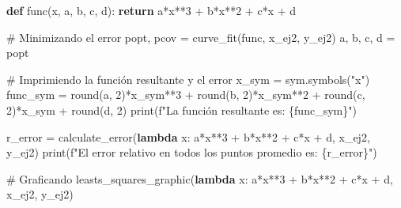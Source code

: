 \documentclass[
  letterpaper,
  DIV=11,
  numbers=noendperiod]{scrartcl}
\newenvironment{Shaded}{\begin{snugshade}}{\end{snugshade}}
\newcommand{\BuiltInTok}[1]{\textcolor[rgb]{0.00,0.23,0.31}{#1}}
\newcommand{\CommentTok}[1]{\textcolor[rgb]{0.37,0.37,0.37}{#1}}
\newcommand{\ControlFlowTok}[1]{\textcolor[rgb]{0.00,0.23,0.31}{\textbf{#1}}}
\newcommand{\DecValTok}[1]{\textcolor[rgb]{0.68,0.00,0.00}{#1}}
\newcommand{\KeywordTok}[1]{\textcolor[rgb]{0.00,0.23,0.31}{\textbf{#1}}}
\newcommand{\NormalTok}[1]{\textcolor[rgb]{0.00,0.23,0.31}{#1}}
\newcommand{\OperatorTok}[1]{\textcolor[rgb]{0.37,0.37,0.37}{#1}}
\newcommand{\SpecialCharTok}[1]{\textcolor[rgb]{0.37,0.37,0.37}{#1}}
\newcommand{\SpecialStringTok}[1]{\textcolor[rgb]{0.13,0.47,0.30}{#1}}
\newcommand{\StringTok}[1]{\textcolor[rgb]{0.13,0.47,0.30}{#1}}
\begin{document}
\begin{Shaded}
\begin{Highlighting}[]

\KeywordTok{def}\NormalTok{ func(x, a, b, c, d):}
    \ControlFlowTok{return}\NormalTok{ a}\OperatorTok{*}\NormalTok{x}\OperatorTok{**}\DecValTok{3} \OperatorTok{+}\NormalTok{ b}\OperatorTok{*}\NormalTok{x}\OperatorTok{**}\DecValTok{2} \OperatorTok{+}\NormalTok{ c}\OperatorTok{*}\NormalTok{x }\OperatorTok{+}\NormalTok{ d}

\CommentTok{\# Minimizando el error}
\NormalTok{popt, pcov }\OperatorTok{=}\NormalTok{ curve\_fit(func, x\_ej2, y\_ej2)}
\NormalTok{a, b, c, d }\OperatorTok{=}\NormalTok{ popt}

\CommentTok{\# Imprimiendo la función resultante y el error}
\NormalTok{x\_sym }\OperatorTok{=}\NormalTok{ sym.symbols(}\StringTok{"x"}\NormalTok{)}
\NormalTok{func\_sym }\OperatorTok{=} \BuiltInTok{round}\NormalTok{(a, }\DecValTok{2}\NormalTok{)}\OperatorTok{*}\NormalTok{x\_sym}\OperatorTok{**}\DecValTok{3} \OperatorTok{+} \BuiltInTok{round}\NormalTok{(b, }\DecValTok{2}\NormalTok{)}\OperatorTok{*}\NormalTok{x\_sym}\OperatorTok{**}\DecValTok{2} \OperatorTok{+} \BuiltInTok{round}\NormalTok{(c, }\DecValTok{2}\NormalTok{)}\OperatorTok{*}\NormalTok{x\_sym }\OperatorTok{+} \BuiltInTok{round}\NormalTok{(d, }\DecValTok{2}\NormalTok{)}
\BuiltInTok{print}\NormalTok{(}\SpecialStringTok{f"La función resultante es: }\SpecialCharTok{\{}\NormalTok{func\_sym}\SpecialCharTok{\}}\SpecialStringTok{"}\NormalTok{)}

\NormalTok{r\_error }\OperatorTok{=}\NormalTok{ calculate\_error(}\KeywordTok{lambda}\NormalTok{ x: a}\OperatorTok{*}\NormalTok{x}\OperatorTok{**}\DecValTok{3} \OperatorTok{+}\NormalTok{ b}\OperatorTok{*}\NormalTok{x}\OperatorTok{**}\DecValTok{2} \OperatorTok{+}\NormalTok{ c}\OperatorTok{*}\NormalTok{x }\OperatorTok{+}\NormalTok{ d, x\_ej2, y\_ej2)}
\BuiltInTok{print}\NormalTok{(}\SpecialStringTok{f"El error relativo en todos los puntos promedio es: }\SpecialCharTok{\{}\NormalTok{r\_error}\SpecialCharTok{\}}\SpecialStringTok{"}\NormalTok{)}

\CommentTok{\# Graficando}
\NormalTok{leasts\_squares\_graphic(}\KeywordTok{lambda}\NormalTok{ x: a}\OperatorTok{*}\NormalTok{x}\OperatorTok{**}\DecValTok{3} \OperatorTok{+}\NormalTok{ b}\OperatorTok{*}\NormalTok{x}\OperatorTok{**}\DecValTok{2} \OperatorTok{+}\NormalTok{ c}\OperatorTok{*}\NormalTok{x }\OperatorTok{+}\NormalTok{ d, x\_ej2, y\_ej2)}
\end{Highlighting}
\end{Shaded}
\end{document}
